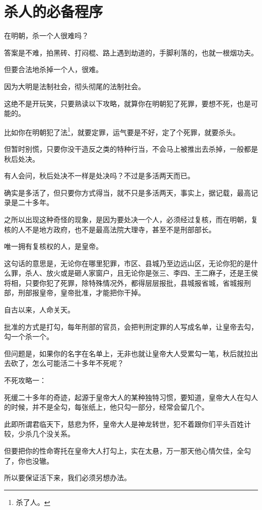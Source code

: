 \section{杀人的必备程序}
\ifnum{}
	\begin{multicols}{\theparacolNo}
\fi
在明朝，杀一个人很难吗？

答案是不难，拍黑砖、打闷棍、路上遇到劫道的，手脚利落的，也就一根烟功夫。

但要合法地杀掉一个人，很难。

因为大明是法制社会，彻头彻尾的法制社会。

这绝不是开玩笑，只要熟读以下攻略，就算你在明朝犯了死罪，要想不死，也是可能的。

比如你在明朝犯了法\footnote{杀了人。}，就要定罪，运气要是不好，定了个死罪，就要杀头。

但暂时别慌，只要你没干造反之类的特种行当，不会马上被推出去杀掉，一般都是秋后处决。

有人会问，秋后处决不一样是处决吗？不过是多活两天而已。

确实是多活了，但只要你方式得当，就不只是多活两天，事实上，据记载，最高记录是二十多年。

之所以出现这种奇怪的现象，是因为要处决一个人，必须经过复核，而在明朝，复核的人不是地方政府，也不是最高法院大理寺，甚至不是刑部部长。

唯一拥有复核权的人，是皇帝。

这句话的意思是，无论你在哪里犯罪，市区、县城乃至边远山区，无论你犯的是什么罪，杀人、放火或是砸人家窗户，且无论你是张三、李四、王二麻子，还是王侯将相，只要你犯了死罪，除特殊情况外，都得层层报批，县城报省城，省城报刑部，刑部报皇帝，皇帝批准，才能把你干掉。

自古以来，人命关天。

批准的方式是打勾，每年刑部的官员，会把判刑定罪的人写成名单，让皇帝去勾，勾一个杀一个。

但问题是，如果你的名字在名单上，无非也就让皇帝大人受累勾一笔，秋后就拉出去砍了，怎么可能活二十多年不死呢？

不死攻略一：

死缓二十多年的奇迹，起源于皇帝大人的某种独特习惯，要知道，皇帝大人在勾人的时候，并不是全勾，每张纸上，他只勾一部分，经常会留几个。

此即所谓君临天下，慈悲为怀，皇帝大人是神龙转世，犯不着跟你们平头百姓计较，少杀几个没关系。

但要把你的性命寄托在皇帝大人打勾上，实在太悬，万一那天他心情欠佳，全勾了，你也没辙。

所以要保证活下来，我们必须另想办法。


\end{multicols}
